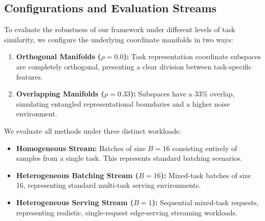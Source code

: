 \subsection{Configurations and Evaluation Streams}
To evaluate the robustness of our framework under different levels of task similarity, we configure the underlying coordinate manifolds in two ways:
\begin{enumerate}
    \item \textbf{Orthogonal Manifolds ($\rho = 0.0$):} Task representation coordinate subspaces are completely orthogonal, presenting a clear division between task-specific features.
    \item \textbf{Overlapping Manifolds ($\rho = 0.33$):} Subspaces have a 33\% overlap, simulating entangled representational boundaries and a higher noise environment.
\end{enumerate}

We evaluate all methods under three distinct workloads:
\begin{itemize}
    \item \textbf{Homogeneous Stream:} Batches of size $B=16$ consisting entirely of samples from a single task. This represents standard batching scenarios.
    \item \textbf{Heterogeneous Batching Stream ($B=16$):} Mixed-task batches of size 16, representing standard multi-task serving environments.
    \item \textbf{Heterogeneous Serving Stream ($B=1$):} Sequential mixed-task requests, representing realistic, single-request edge-serving streaming workloads.
\end{itemize}

